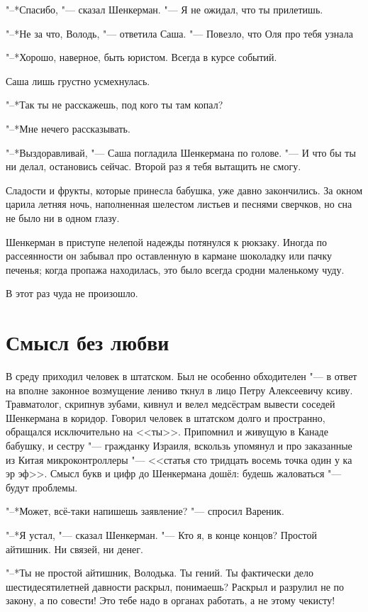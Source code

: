 "--*Спасибо, "--- сказал Шенкерман.
"--- Я не ожидал, что ты прилетишь.

"--*Не за что, Володь, "--- ответила Саша.
"--- Повезло, что Оля про тебя узнала\ldotst

"--*Хорошо, наверное, быть юристом.
Всегда в курсе событий.

Саша лишь грустно усмехнулась.

"--*Так ты не расскажешь, под кого ты там копал?

"--*Мне нечего рассказывать.

"--*Выздоравливай, "--- Саша погладила Шенкермана по голове.
"--- И что бы ты ни делал, остановись сейчас.
Второй раз я тебя вытащить не смогу.

Сладости и фрукты, которые принесла бабушка, уже давно закончились.
За окном царила летняя ночь, наполненная шелестом листьев и песнями сверчков, но сна не было ни в одном глазу.

Шенкерман в приступе нелепой надежды потянулся к рюкзаку.
Иногда по рассеянности он забывал про оставленную в кармане шоколадку или пачку печенья;
когда пропажа находилась, это было всегда сродни маленькому чуду.

В этот раз чуда не произошло.

\section{Смысл без любви}

В среду приходил человек в штатском.
Был не особенно обходителен "--- в ответ на вполне законное возмущение лениво ткнул в лицо Петру Алексеевичу ксиву.
Травматолог, скрипнув зубами, кивнул и велел медсёстрам вывести соседей Шенкермана в коридор.
Говорил человек в штатском долго и пространно, обращался исключительно на <<ты>>.
Припомнил и живущую в Канаде бабушку, и сестру "--- гражданку Израиля, вскользь упомянул и про заказанные из Китая микроконтроллеры "--- <<статья сто тридцать восемь точка один у ка эр эф>>.
Смысл букв и цифр до Шенкермана дошёл: будешь жаловаться "--- будут проблемы.

"--*Может, всё-таки напишешь заявление? "--- спросил Вареник.

"--*Я устал, "--- сказал Шенкерман.
"--- Кто я, в конце концов?
Простой айтишник.
Ни связей, ни денег.

"--*Ты не простой айтишник, Володька.
Ты гений.
Ты фактически дело шестидесятилетней давности раскрыл, понимаешь?
Раскрыл и разрулил не по закону, а по совести!
Это тебе надо в органах работать, а не этому чекисту!

